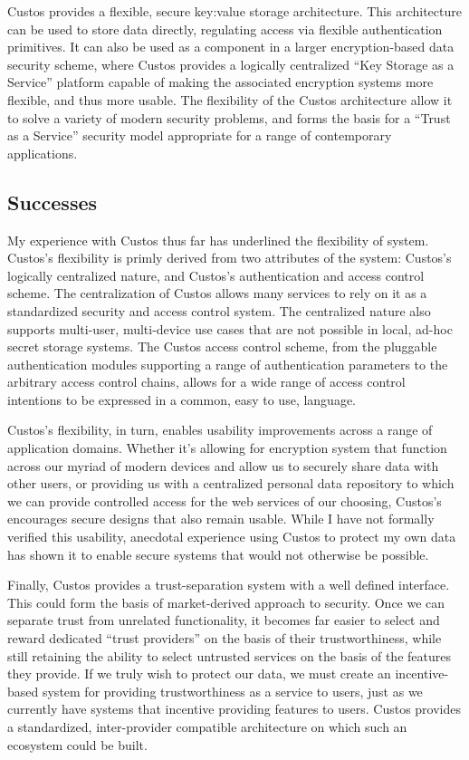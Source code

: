 Custos provides a flexible, secure key:value storage
architecture. This architecture can be used to store data directly,
regulating access via flexible authentication primitives. It can also
be used as a component in a larger encryption-based data security
scheme, where Custos provides a logically centralized ``Key Storage as
a Service'' platform capable of making the associated encryption
systems more flexible, and thus more usable. The flexibility of the
Custos architecture allow it to solve a variety of modern security
problems, and forms the basis for a ``Trust as a Service'' security
model appropriate for a range of contemporary applications.

\subsection{Successes}

My experience with Custos thus far has underlined the flexibility of
system. Custos's flexibility is primly derived from two attributes of
the system: Custos's logically centralized nature, and Custos's
authentication and access control scheme. The centralization of Custos
allows many services to rely on it as a standardized security and
access control system. The centralized nature also supports
multi-user, multi-device use cases that are not possible in local,
ad-hoc secret storage systems. The Custos access control scheme, from
the pluggable authentication modules supporting a range of
authentication parameters to the arbitrary access control chains,
allows for a wide range of access control intentions to be expressed
in a common, easy to use, language.

Custos's flexibility, in turn, enables usability improvements across a
range of application domains. Whether it's allowing for encryption
system that function across our myriad of modern devices and allow
us to securely share data with other users, or providing us with a
centralized personal data repository to which we can provide
controlled access for the web services of our choosing, Custos's
encourages secure designs that also remain usable. While I have not
formally verified this usability, anecdotal experience using Custos to
protect my own data has shown it to enable secure systems that would
not otherwise be possible.

Finally, Custos provides a trust-separation system with a well defined
interface. This could form the basis of market-derived approach to
security. Once we can separate trust from unrelated functionality, it
becomes far easier to select and reward dedicated ``trust providers''
on the basis of their trustworthiness, while still retaining the
ability to select untrusted services on the basis of the features they
provide. If we truly wish to protect our data, we must create an
incentive-based system for providing trustworthiness as a service to
users, just as we currently have systems that incentive providing
features to users. Custos provides a standardized, inter-provider
compatible architecture on which such an ecosystem could be built.

